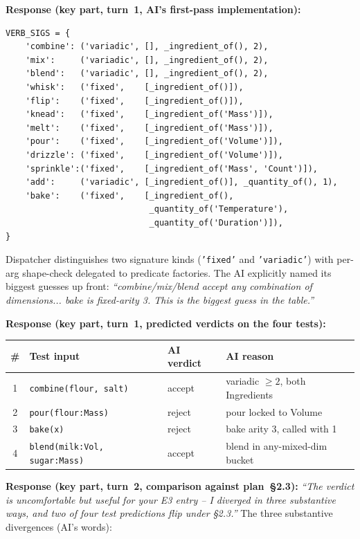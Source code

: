 \documentclass[11pt,a4paper]{article}
\newcommand{\field}[1]{\noindent\textbf{#1}}
\begin{document}
\field{Response (key part, turn~1, AI's first-pass implementation):}

\begin{lstlisting}[style=py]
VERB_SIGS = {
    'combine': ('variadic', [], _ingredient_of(), 2),
    'mix':     ('variadic', [], _ingredient_of(), 2),
    'blend':   ('variadic', [], _ingredient_of(), 2),
    'whisk':   ('fixed',    [_ingredient_of()]),
    'flip':    ('fixed',    [_ingredient_of()]),
    'knead':   ('fixed',    [_ingredient_of('Mass')]),
    'melt':    ('fixed',    [_ingredient_of('Mass')]),
    'pour':    ('fixed',    [_ingredient_of('Volume')]),
    'drizzle': ('fixed',    [_ingredient_of('Volume')]),
    'sprinkle':('fixed',    [_ingredient_of('Mass', 'Count')]),
    'add':     ('variadic', [_ingredient_of()], _quantity_of(), 1),
    'bake':    ('fixed',    [_ingredient_of(),
                             _quantity_of('Temperature'),
                             _quantity_of('Duration')]),
}
\end{lstlisting}

Dispatcher distinguishes two signature kinds (\texttt{'fixed'} and
\texttt{'variadic'}) with per-arg shape-check delegated to predicate
factories. The AI explicitly named its biggest guesses up front:
\emph{``combine/mix/blend accept any combination of dimensions...
bake is fixed-arity 3. This is the biggest guess in the table.''}

\field{Response (key part, turn~1, predicted verdicts on the four tests):}

\begin{center}
\small
\begin{tabular}{@{}clll@{}}
\toprule
\textbf{\#} & \textbf{Test input} & \textbf{AI verdict} & \textbf{AI reason} \\
\midrule
1 & \texttt{combine(flour, salt)}        & accept & variadic $\geq 2$, both Ingredients \\
2 & \texttt{pour(flour:Mass)}            & reject & pour locked to Volume \\
3 & \texttt{bake(x)}                     & reject & bake arity 3, called with 1 \\
4 & \texttt{blend(milk:Vol, sugar:Mass)} & accept & blend in any-mixed-dim bucket \\
\bottomrule
\end{tabular}
\end{center}

\field{Response (key part, turn~2, comparison against plan~\S2.3):}
\emph{``The verdict is uncomfortable but useful for your E3 entry --
I diverged in three substantive ways, and two of four test predictions
flip under \S2.3.''} The three substantive divergences (AI's words):
\end{document}
